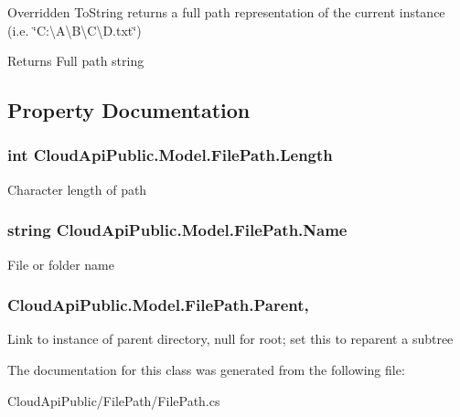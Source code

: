 Overridden To\-String returns a full path representation of the current instance (i.\-e. \char`\"{}\-C\-:\textbackslash{}\-A\textbackslash{}\-B\textbackslash{}\-C\textbackslash{}\-D.\-txt\char`\"{}) 

\begin{DoxyReturn}{Returns}
Full path string
\end{DoxyReturn}


\subsection{Property Documentation}
\hypertarget{class_cloud_api_public_1_1_model_1_1_file_path_a6e415515bb70328b0ac881f9703be2c2}{
\subsubsection[{Length}]{\setlength{\rightskip}{0pt plus 5cm}int Cloud\-Api\-Public.\-Model.\-File\-Path.\-Length\hspace{0.3cm}{\ttfamily [get]}}}\label{class_cloud_api_public_1_1_model_1_1_file_path_a6e415515bb70328b0ac881f9703be2c2}


Character length of path 

\hypertarget{class_cloud_api_public_1_1_model_1_1_file_path_a02285f24ec2d49c85778d6b5a251aa7b}{
\subsubsection[{Name}]{\setlength{\rightskip}{0pt plus 5cm}string Cloud\-Api\-Public.\-Model.\-File\-Path.\-Name\hspace{0.3cm}{\ttfamily [get]}}}\label{class_cloud_api_public_1_1_model_1_1_file_path_a02285f24ec2d49c85778d6b5a251aa7b}


File or folder name 

\hypertarget{class_cloud_api_public_1_1_model_1_1_file_path_a4c3e4582847856e2a49370fb421d4c70}{
\subsubsection[{Parent}]{ Cloud\-Api\-Public.\-Model.\-File\-Path.\-Parent\hspace{0.3cm}{\ttfamily [get]}, {\ttfamily [set]}}}\label{class_cloud_api_public_1_1_model_1_1_file_path_a4c3e4582847856e2a49370fb421d4c70}


Link to instance of parent directory, null for root; set this to reparent a subtree 



The documentation for this class was generated from the following file\-:\begin{DoxyCompactItemize}
\item 
Cloud\-Api\-Public/\-File\-Path/File\-Path.\-cs\end{DoxyCompactItemize}

